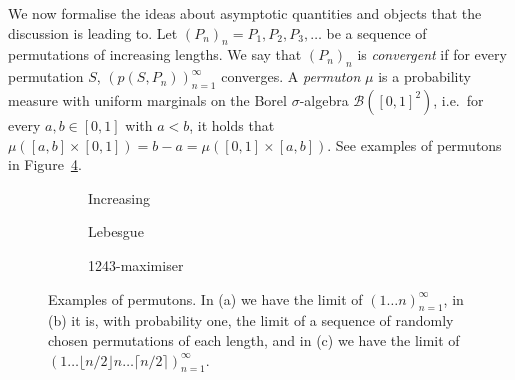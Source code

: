 \documentclass[12pt, a4paper, twoside]{report}
\begin{document}
We now formalise the ideas about asymptotic quantities and objects that the discussion is leading to. Let $(P_n)_n = P_1,P_2,P_3,\ldots$ be a sequence of permutations of increasing lengths. We say that $(P_n)_n$ is \emph{convergent} if for every permutation $S$, $(p(S,P_n))_{n=1}^\infty$ converges. A \emph{permuton} $\mu$ is a probability measure with uniform marginals on the Borel $\sigma$-algebra $\mathcal{B}([0,1]^2)$, i.e.~for every $a,b \in [0,1]$ with $a<b$, it holds that $\mu([a,b] \times [0,1]) = b-a = \mu([0,1] \times [a,b])$. See examples of permutons in Figure~\ref{fig:permutons}. 

\begin{figure}[ht]
  \centering
  \begin{subfigure}[b]{0.3\textwidth}
    \centering
      \caption{\small Increasing}
      \label{fig:increasing}
    \end{subfigure}
    \begin{subfigure}[b]{0.3\textwidth}
      \centering
      \caption{\small Lebesgue}
      \label{fig:lebesgue}
    \end{subfigure}
    \begin{subfigure}[b]{0.3\textwidth}
      \centering
      \caption{\small 1243-maximiser}
      \label{fig:max1243}
    \end{subfigure}
    \caption{\small Examples of permutons. In (a) we have the limit of $(1\ldots n)_{n=1}^\infty$, in (b) it is, with probability one, the limit of a sequence of randomly chosen permutations of each length, and in (c) we have the limit of $(1\ldots \lfloor n/2 \rfloor n \ldots \lceil n/2 \rceil)_{n=1}^\infty$.}
    \label{fig:permutons}
\end{figure}
\end{document}
